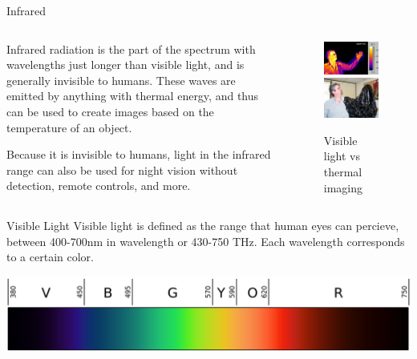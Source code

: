 \documentclass{beamer}
\begin{document}
\begin{frame}{Infrared}
\begin{columns}
    \begin{column}{.5\textwidth}
    Infrared radiation is the part of the spectrum with wavelengths just longer than visible light, and is generally invisible to humans. \vspace{2mm}
    These waves are emitted by anything with thermal energy, and thus can be used to create images based on the temperature of an object. 
    
    \vspace{2mm}
    Because it is invisible to humans, light in the infrared range can also be used for night vision without detection, remote controls, and more. 
    \end{column}
    \begin{column}{.5\textwidth}
    \begin{figure}
        \centering
        \includegraphics[scale=.35]{infrared1.jpg}
        \includegraphics[scale=.35]{infrared2.jpg}
        \caption{Visible light vs thermal imaging}
        \label{fig:infrared}
    \end{figure}
    \end{column}
\end{columns}
\end{frame}

\begin{frame}{Visible Light}
	Visible light is defined as the range that human eyes can percieve, between 400-700nm in wavelength or 430-750 THz. Each wavelength corresponds to a certain color. 
	
	\includegraphics[scale=.22]{lightspectrum.png}
\end{frame}
\end{document}
